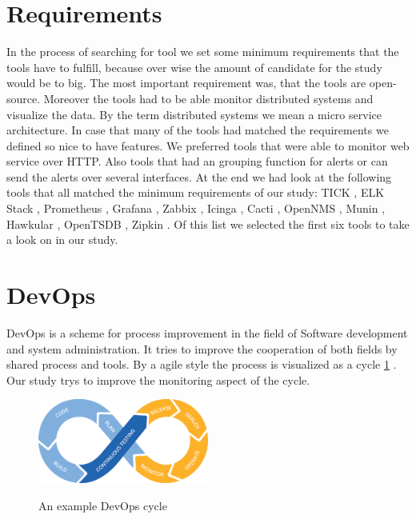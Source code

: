 \section{Requirements}
\label{minimumrequire}
In the process of searching for tool we set some minimum requirements that the tools have to fulfill, because over wise the amount of candidate for the study would be to big. The most important requirement was, that the tools are open-source. Moreover the tools had to be able monitor distributed systems and visualize the data. By the term distributed systems we  mean a micro service architecture.
In case that many of the tools had matched the requirements we defined so nice to have features. We preferred tools that were able to monitor web service over HTTP. Also tools that had an grouping function for alerts or can send the alerts over several interfaces.
At the end we had look at the following tools that all matched the minimum requirements of our study: TICK \cite{tick}, ELK Stack \cite{elk}, Prometheus \cite{prometheus}, Grafana \cite{grafana}, Zabbix \cite{zabbix}, Icinga \cite{icinga}, Cacti \cite{cacti}, OpenNMS \cite{opennms}, Munin \cite{munin}, Hawkular \cite{hawkular}, OpenTSDB \cite{opentsdb}, Zipkin \cite{zipkin}. Of this list we selected the first six tools to take a look on in our study.   


\section{DevOps}
\label{devops}
DevOps is a scheme for process improvement in the field of Software development and system administration\cite{Bass:2015:DSA:2810087}. It tries to improve the cooperation of both fields by shared process and tools.
By a agile style the process is visualized as a cycle \cref{fig:devopscycle} . Our study trys to improve the monitoring aspect of the cycle.
\begin{figure}
	\centering
	\includegraphics[width=0.5\textwidth]{Bilder/devopscycle}
	\caption{An example DevOps cycle}
	\label{fig:devopscycle}
	\cite{Devops}
\end{figure}
